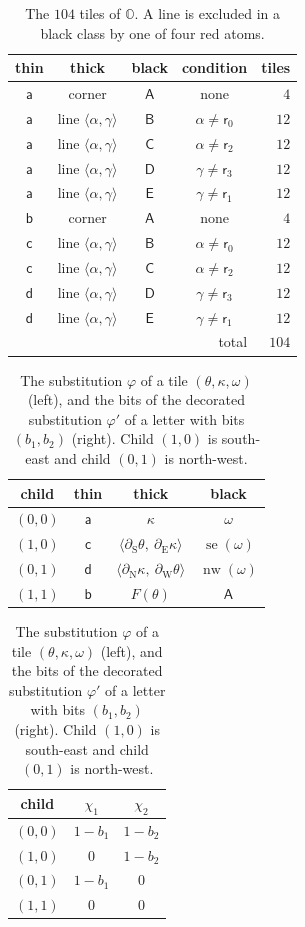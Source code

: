 \begin{table}[ht]
\centering
\begin{tabular}{c|c|c|c|r}
thin & thick & black & condition & tiles\\\hline
$\mathsf a$ & corner & $\mathsf A$ & none & $4$\\
$\mathsf a$ & line $\langle\alpha,\gamma\rangle$ & $\mathsf B$ & $\alpha\ne\mathsf r_0$ & $12$\\
$\mathsf a$ & line $\langle\alpha,\gamma\rangle$ & $\mathsf C$ & $\alpha\ne\mathsf r_2$ & $12$\\
$\mathsf a$ & line $\langle\alpha,\gamma\rangle$ & $\mathsf D$ & $\gamma\ne\mathsf r_3$ & $12$\\
$\mathsf a$ & line $\langle\alpha,\gamma\rangle$ & $\mathsf E$ & $\gamma\ne\mathsf r_1$ & $12$\\
$\mathsf b$ & corner & $\mathsf A$ & none & $4$\\
$\mathsf c$ & line $\langle\alpha,\gamma\rangle$ & $\mathsf B$ & $\alpha\ne\mathsf r_0$ & $12$\\
$\mathsf c$ & line $\langle\alpha,\gamma\rangle$ & $\mathsf C$ & $\alpha\ne\mathsf r_2$ & $12$\\
$\mathsf d$ & line $\langle\alpha,\gamma\rangle$ & $\mathsf D$ & $\gamma\ne\mathsf r_3$ & $12$\\
$\mathsf d$ & line $\langle\alpha,\gamma\rangle$ & $\mathsf E$ & $\gamma\ne\mathsf r_1$ & $12$\\\hline
\multicolumn{4}{r|}{total} & $104$
\end{tabular}
\caption{The $104$ tiles of $\mathbb O$. A line is excluded in a black class by one of four red atoms.}
\label{scf:tab-alphabet}
\end{table}

\begin{table}[ht]
\centering
\begin{tabular}{c|c|c|c}
child & thin & thick & black\\\hline
$(0,0)$ & $\mathsf a$ & $\kappa$ & $\omega$\\
$(1,0)$ & $\mathsf c$ & $\langle\partial_{\mathrm S}\theta,\ \partial_{\mathrm E}\kappa\rangle$ & $\operatorname{se}(\omega)$\\
$(0,1)$ & $\mathsf d$ & $\langle\partial_{\mathrm N}\kappa,\ \partial_{\mathrm W}\theta\rangle$ & $\operatorname{nw}(\omega)$\\
$(1,1)$ & $\mathsf b$ & $F(\theta)$ & $\mathsf A$
\end{tabular}
\qquad
\begin{tabular}{c|c|c}
child & $\chi_1$ & $\chi_2$\\\hline
$(0,0)$ & $1-b_1$ & $1-b_2$\\
$(1,0)$ & $0$ & $1-b_2$\\
$(0,1)$ & $1-b_1$ & $0$\\
$(1,1)$ & $0$ & $0$
\end{tabular}
\caption{The substitution $\varphi$ of a tile $(\theta,\kappa,\omega)$ (left), and the bits of the decorated substitution $\varphi'$ of a letter with bits $(b_1,b_2)$ (right). Child $(1,0)$ is south-east and child $(0,1)$ is north-west.}
\label{scf:tab-subst}
\end{table}

